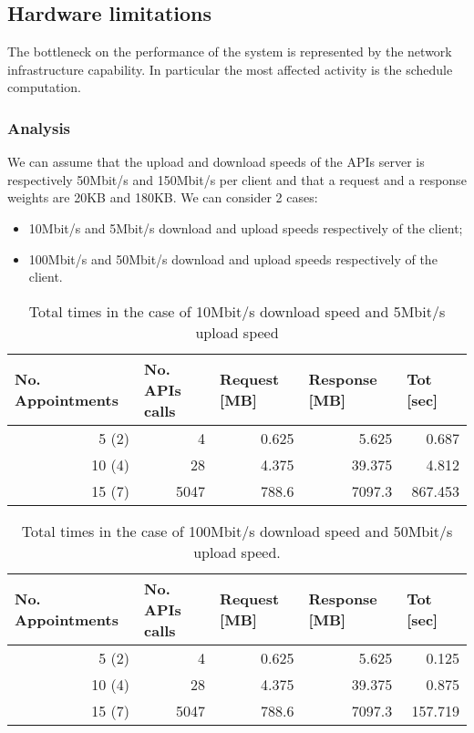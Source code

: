 \subsection{Hardware limitations}
The bottleneck on the performance of the system is represented by the network infrastructure capability. In particular the most affected activity is the schedule computation.
\subsubsection{Analysis}
We can assume that the upload and download speeds of the APIs server is respectively 50Mbit/s and 150Mbit/s per client and that a request and a response weights are 20KB and 180KB.
We can consider 2 cases:
\begin{itemize}
\item 10Mbit/s and 5Mbit/s download and upload speeds respectively of the client;
\item 100Mbit/s and 50Mbit/s download and upload speeds respectively of the client.
\end{itemize}

\begin{table}[htbp]
  \centering
    \begin{tabular}{|r|r|r|r|r|}
    \hline
    \multicolumn{1}{|l|}{\textbf{No. Appointments}} & \multicolumn{1}{l|}{\textbf{No. APIs calls}} & \multicolumn{1}{l|}{\textbf{Request [MB]}} & \multicolumn{1}{l|}{\textbf{Response [MB]}} & \multicolumn{1}{l|}{\textbf{Tot [sec]}} \\ \hline
    5 (2)    & 4   & 0.625 & 5.625 & 0.687 \\ \hline
    10 (4)   & 28 & 4.375 & 39.375 & 4.812 \\ \hline
    15 (7)   & 5047 & 788.6 & 7097.3 & 867.453 \\ \hline
    \end{tabular}%
    \caption{Total times in the case of 10Mbit/s download speed and 5Mbit/s upload speed}
  \label{tab:addlabel}%
\end{table}%

\begin{table}[htbp]
  \centering
    \begin{tabular}{|r|r|r|r|r|}
    \hline
    \multicolumn{1}{|l|}{\textbf{No. Appointments}} & \multicolumn{1}{l|}{\textbf{No. APIs calls}} & \multicolumn{1}{l|}{\textbf{Request [MB]}} & \multicolumn{1}{l|}{\textbf{Response [MB]}} & \multicolumn{1}{l|}{\textbf{Tot [sec]}} \\ \hline
    5 (2)    & 4   & 0.625 & 5.625 & 0.125 \\ \hline
    10 (4)   & 28 & 4.375 & 39.375 & 0.875 \\ \hline
    15 (7)   & 5047 & 788.6 & 7097.3 & 157.719 \\ \hline
    \end{tabular}%
    \caption{Total times in the case of 100Mbit/s download speed and 50Mbit/s upload speed.}
  \label{tab:addlabel}%
\end{table}%

